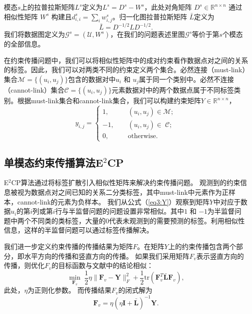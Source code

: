 模态$s$上的拉普拉斯矩阵$ {L}^s $定义为$ {L}^s={D}^s-{W}^s $，此处对角矩阵
$ {D} ^s \in \mathbb{R}^{n\times n}$ 通过相似性矩阵 $ {W} ^s$ 构建且$ d^s_{i,i} =\sum_i w^s_{i,j}$\cite{chung1997spectral}。归一化图拉普拉斯矩阵 $ \bar{{L}} $定义为
\begin{equation}
	\bar{{L}} = {D}^{-1/2}{LD}^{-1/2}.
\end{equation}
我们将数据图定义为$\mathcal{G}^s = (\mathcal{U},{W}^s)$，在我们的问题表述里图$\mathcal{G}^s$等价于第$s$个模态的全部信息。

在约束传播问题中，我们可以将相似性矩阵中的成对约束看作数据点对之间的关系的标签。因此，我们可以对两类不同的约束定义两个集合。必然连接（must-link）集合$ \mathcal{M} = \{(u_i,u_j)\} $包含的数据对中$ u_i $ 和 $ u_j $属于同一个类别中。必然不连接（cannot-link）集合$ \mathcal{C} = \{(u_i,u_j)\}$元素数据对中的两个数据点属于不同标签类别。根据must-link集合和cannot-link集合，我们可以构建约束矩阵$ {Y} \in  \mathbb{R}^{n\times n}$，
\begin{equation}
y_{i,j} = 
\begin{cases}
1, \qquad&(u_i,u_j)\in \mathcal{M};\\
-1, &(u_i,u_j)\in\; \mathcal{C};\\
0, &\text{otherwise}.
\end{cases}
\label{eq3:Y}
\end{equation}

\subsection{单模态约束传播算法E$^2$CP}
E$^2$CP算法通过将标签扩散引入相似性矩阵来解决约束传播问题。
观测到的约束信息被视为数据点对之间已知的关系二分类标签，其中must-link中元素作为正样本，cannot-link的元素为负样本。
我们从公式（\ref{eq3:Y}）观察到矩阵$Y$中对应于数据$u_i$的第$i$列或第$i$行与半监督问题的问题设置非常相似。其中$ 1 $ 和 $ -1 $为半监督问题中两个不同类的类标签，大量的$0$代表未观测到的需要预测的标签。利用相似性信息，这样的半监督问题可以通过标签传播\cite{zhou2004learning}解决。

我们进一步定义约束传播的传播结果为矩阵$F$。在矩阵$Y$上的约束传播包含两个部分，即水平方向的传播和竖直方向的传播。 如果我们采用矩阵$F_v$表示竖直方向的传播，则优化$F_v$的目标函数与文献\parencite{zhou2004learning}中的结论相似：
\begin{equation}
	\mathop{\mathrm{min}}_{\mathbf{F}_v}\;\frac{1}{2}\eta\|\mathbf{F}_v-\mathbf{Y}\|^2_F+\frac{1}{2}\mathrm{tr}(\mathbf{F}_v^T\bar{\mathbf{L}}\mathbf{F}_v), 
\end{equation}
此处，$ \eta $为正则化参数。
而传播结果$F_v$的闭式解为
\begin{equation}
	\mathbf{F}_v = \eta(\eta\mathbf{I}+\bar{\mathbf{L}})^{-1}\mathbf{Y}.
\end{equation}

